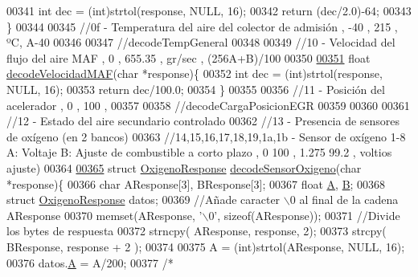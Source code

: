 \begin{DoxyCode}
{{00341     \textcolor{keywordtype}{int} dec = (int)strtol(response, NULL, 16);
00342     \textcolor{keywordflow}{return} (dec/2.0)-64;
00343 \}
00344 
00345 \textcolor{comment}{//0f - Temperatura del aire del colector de admisión , -40 , 215 , ºC, A-40}
00346 
00347 \textcolor{comment}{//decodeTempGeneral}
00348 
00349 \textcolor{comment}{//10 - Velocidad del flujo del aire MAF , 0 , 655.35  , gr/sec , (256A+B)/100 }
00350 
\hyperlink{decoders_8hpp_adceefeb78a70b295b378f4c472630aa1}{00351} \textcolor{keywordtype}{float} \hyperlink{decoders_8cpp_adceefeb78a70b295b378f4c472630aa1}{decodeVelocidadMAF}(\textcolor{keywordtype}{char} *response)\{
00352     \textcolor{keywordtype}{int} dec = (int)strtol(response, NULL, 16);
00353     \textcolor{keywordflow}{return} dec/100.0;
00354 \}
00355 
00356 \textcolor{comment}{//11 - Posición del acelerador , 0 , 100 , %
00357 
00358 \textcolor{comment}{//decodeCargaPosicionEGR}
00359 
00360 
00361 \textcolor{comment}{//12 - Estado del aire secundario controlado }
00362 \textcolor{comment}{//13 - Presencia de sensores de oxígeno (en 2 bancos) }
00363 \textcolor{comment}{//14,15,16,17,18,19,1a,1b - Sensor de oxígeno 1-8 A: Voltaje B: Ajuste de combustible a corto plazo , 0 100
       , 1.275 99.2 , voltios %
       ajuste)  }
00364 
\hyperlink{decoders_8hpp_a5b53fc5fc37fbee9c5e389f6c8c18438}{00365} \textcolor{keyword}{struct }\hyperlink{structOxigenoResponse}{OxigenoResponse} \hyperlink{decoders_8cpp_a5b53fc5fc37fbee9c5e389f6c8c18438}{decodeSensorOxigeno}(char *response)\{
00366     \textcolor{keywordtype}{char} AResponse[3], BResponse[3];
00367     \textcolor{keywordtype}{float} \hyperlink{structOxigenoResponse_a068c403e5746226cf22bb020b4c786d3}{A}, \hyperlink{structOxigenoResponse_a96b19152dd001e19d1351e2d97f22736}{B};
00368     \textcolor{keyword}{struct }\hyperlink{structOxigenoResponse}{OxigenoResponse} datos; 
00369     \textcolor{comment}{//Añade caracter \(\backslash\)0 al final de la cadena AResponse}
00370     memset(AResponse, \textcolor{charliteral}{'\(\backslash\)0'}, \textcolor{keyword}{sizeof}(AResponse));
00371     \textcolor{comment}{//Divide los bytes de respuesta}
00372     strncpy( AResponse, response, 2);
00373     strcpy( BResponse, response + 2 );
00374 
00375     A = (int)strtol(AResponse, NULL, 16);
00376     datos.\hyperlink{structOxigenoResponse_a068c403e5746226cf22bb020b4c786d3}{A} = A/200;
00377     \textcolor{comment}{/*}
}}}
\end{DoxyCode}
